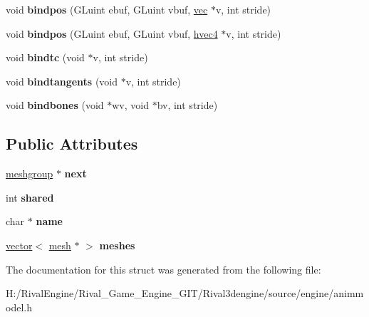 \begin{DoxyCompactItemize}
\item 
\mbox{\label{structanimmodel_1_1meshgroup_aaf7dce2b10521f82630dca8455516a79}} 
void {\bfseries bindpos} (G\+Luint ebuf, G\+Luint vbuf, \hyperlink{structvec}{vec} $\ast$v, int stride)
\item 
\mbox{\label{structanimmodel_1_1meshgroup_a7b8e0bb0f12234c3b79f412640880797}} 
void {\bfseries bindpos} (G\+Luint ebuf, G\+Luint vbuf, \hyperlink{structhvec4}{hvec4} $\ast$v, int stride)
\item 
\mbox{\label{structanimmodel_1_1meshgroup_ae8df120e8d0aaa41320abc1a73aa7abd}} 
void {\bfseries bindtc} (void $\ast$v, int stride)
\item 
\mbox{\label{structanimmodel_1_1meshgroup_a0ba5e1098c48fa71d13e453319ec0f21}} 
void {\bfseries bindtangents} (void $\ast$v, int stride)
\item 
\mbox{\label{structanimmodel_1_1meshgroup_ada6e92dc9c9d883384ca756b26f90c81}} 
void {\bfseries bindbones} (void $\ast$wv, void $\ast$bv, int stride)
\end{DoxyCompactItemize}
\subsection*{Public Attributes}
\begin{DoxyCompactItemize}
\item 
\mbox{\label{structanimmodel_1_1meshgroup_ab4c26d6a82b2b7e4ccc22011ee6274be}} 
\hyperlink{structanimmodel_1_1meshgroup}{meshgroup} $\ast$ {\bfseries next}
\item 
\mbox{\label{structanimmodel_1_1meshgroup_a9096b447782c622774b95bcfbd415b76}} 
int {\bfseries shared}
\item 
\mbox{\label{structanimmodel_1_1meshgroup_a333a1a07c0b2befba2cb8b8b4647415a}} 
char $\ast$ {\bfseries name}
\item 
\mbox{\label{structanimmodel_1_1meshgroup_ae6cd91e3f3e98f3fe5318d4ab5062aa3}} 
\hyperlink{structvector}{vector}$<$ \hyperlink{structanimmodel_1_1mesh}{mesh} $\ast$ $>$ {\bfseries meshes}
\end{DoxyCompactItemize}


The documentation for this struct was generated from the following file\+:\begin{DoxyCompactItemize}
\item 
H\+:/\+Rival\+Engine/\+Rival\+\_\+\+Game\+\_\+\+Engine\+\_\+\+G\+I\+T/\+Rival3dengine/source/engine/animmodel.\+h\end{DoxyCompactItemize}
